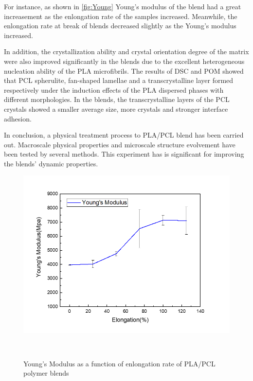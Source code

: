 \documentclass[a4paper,sans]{article}
\begin{document}
		For instance, as shown in \autoref{fig:Young} Young's modulus of the blend had a great increasement
		as the enlongation rate of the samples increased. Meanwhile, the enlongation rate at break of blends decreased slightly as the Young's modulus increased.

		In addition, the crystallization ability and crystal orientation degree of the matrix were also improved significantly in the blends due to the excellent heterogeneous nucleation ability of the PLA microfibrils.\cite{RN98}
		The results of DSC and POM showed that PCL spherulite, fan-shaped lamellae and a transcrystalline layer formed respectively under the induction effects of the PLA dispersed phases with different morphologies. In the blends, the transcrystalline layers of the PCL crystals showed a smaller average size, more crystals and stronger interface adhesion. 
		

		In conclusion, a physical treatment process to PLA/PCL blend has been carried out.
		Macroscale physical properties and microscale structure evolvement have been tested by several methods. 
		This experiment has is significant for improving the blends' dynamic properties.
	\begin{figure}[h]
		\centering
		\includegraphics[scale = 0.5]{figures/Young.png}
		\caption{Young's Modulus as a function of enlongation rate of PLA/PCL polymer blends} ~\label{fig:Young}
	\end{figure}
		
	\clearpage
	\renewcommand{\refname}{Reference}{}
	
\end{document}
